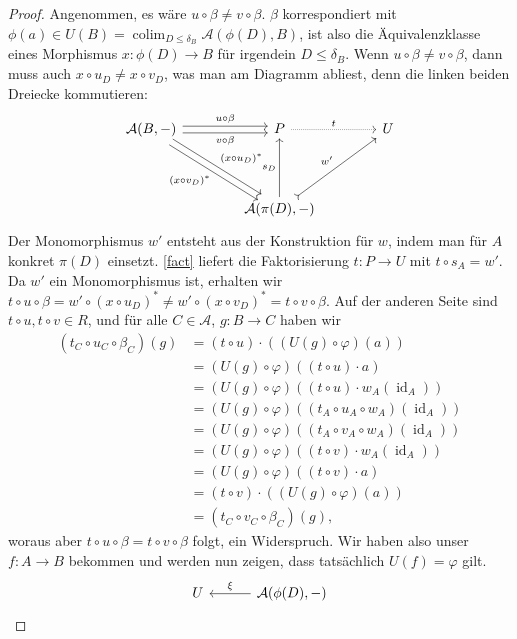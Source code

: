\documentclass[a4paper, parskip=half]{scrartcl}
\theoremstyle{marginbreak}
\theoremstyle{nonumberplain}
\newtheorem{proof}{Beweis.}
\newcommand\cat\mathcal
\newcommand{\n}{\pgfmatrixnextcell}
\DeclareMathOperator{\colim}{colim}
\DeclareMathOperator{\id}{id}
\begin{document}
{\begin{proof}
			Angenommen, es wäre $u\circ\beta\neq v\circ\beta$. $\beta$ korrespondiert
			mit $\phi(a)\in U(B) = \colim_{D\leq\delta_B}\cat{A}(\phi(D), B)$, ist
			also die Äquivalenzklasse eines Morphismus $x\colon\phi(D)\to B$ für
			irgendein $D\leq\delta_B$. Wenn $u\circ\beta\neq v\circ\beta$, dann muss
			auch $x\circ u_D\neq x\circ v_D$, was man am Diagramm abliest, denn die
			linken beiden Dreiecke kommutieren:
			\[
				\begin{tikzcd}[sep=4em]
					\cat{A}(B,{-})
						\ar[shift left]{r}{u\circ\beta}
						\ar[shift right, ']{r}{v\circ\beta}
						\ar[shift left]{dr}{(x\circ u_D)^*}
						\ar[shift right, ']{dr}{(x\circ v_D)^*} \n
					P
						\ar[densely dotted]{r}{t} \n
					U \\ \n
					\cat{A}(\pi(D),{-})
						\ar[tail]{ru}{w'}
						\ar{u}{s_D}
				\end{tikzcd}
			\]
			Der Monomorphismus $w'$ entsteht aus der Konstruktion für $w$, indem
			man für $A$ konkret $\pi(D)$ einsetzt. \ref{fact} liefert die Faktorisierung
			$t\colon P\to U$ mit $t\circ s_A=w'$. Da $w'$ ein Monomorphismus ist, erhalten
			wir $t\circ u\circ\beta=w'\circ(x\circ u_D)^*\neq w'\circ(x\circ v_D)^*=t\circ v\circ\beta$.
			Auf der anderen Seite sind $t\circ u, t\circ v\in R$, und für alle $C\in\cat{A}$,
			$g\colon B\to C$ haben wir
			\begin{align*}
				(t_C\circ u_C\circ \beta_C)(g) &= (t\circ u)\cdot((U(g)\circ\varphi)(a))\\
					&= (U(g)\circ\varphi)((t\circ u)\cdot a)\\
					&= (U(g)\circ\varphi)((t\circ u)\cdot w_A(\id_A))\\
					&= (U(g)\circ\varphi)((t_A\circ u_A\circ w_A)(\id_A))\\
					&= (U(g)\circ\varphi)((t_A\circ v_A\circ w_A)(\id_A))\\
					&= (U(g)\circ\varphi)((t\circ v)\cdot w_A(\id_A))\\
					&= (U(g)\circ\varphi)((t\circ v)\cdot a)\\
					&= (t\circ v)\cdot((U(g)\circ\varphi)(a))\\
					&= (t_C\circ v_C\circ\beta_C)(g),
			\end{align*}
			woraus aber $t\circ u\circ\beta=t\circ v\circ\beta$ folgt, ein Widerspruch.
			Wir haben also unser $f\colon A\to B$ bekommen und werden nun zeigen, dass
			tatsächlich $U(f)=\varphi$ gilt.
			\[
				\begin{tikzcd}[sep=3em]
					U \n
					\cat{A}(\phi(D),{-})
						\ar[']{l}{\xi}

\end{tikzcd}\]
\end{proof}}
\end{document}
